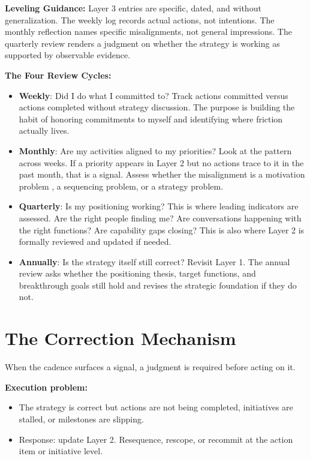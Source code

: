 \documentclass{article}
\begin{document}
\textbf{Leveling Guidance:} Layer 3 entries are specific, dated, and without generalization. The weekly log records actual actions,
not intentions. The monthly reflection names specific misalignments, not general impressions. The quarterly review renders a 
judgment on whether the strategy is working as supported by observable evidence.

\newpage

\textbf{The Four Review Cycles:}

\begin{itemize}
	\item \textbf{Weekly}: Did I do what I committed to? Track actions committed versus actions completed without strategy discussion. 
		The purpose is building the habit of honoring commitments to myself and identifying where friction actually lives.
  \item \textbf{Monthly}: Are my activities aligned to my priorities? Look at the pattern across weeks. If a priority appears in 
	  	Layer 2 but no actions trace to it in the past month, that is a signal. Assess whether the misalignment is a motivation problem
		, a sequencing problem, or a strategy problem.
  \item \textbf{Quarterly}: Is my positioning working? This is where leading indicators are assessed. Are the right people finding me?
	  	Are conversations happening with the right functions? Are capability gaps closing? This is also where Layer 2 is formally 
		reviewed and updated if needed.
  \item \textbf{Annually}: Is the strategy itself still correct? Revisit Layer 1. The annual review asks whether the positioning thesis,
	  	target functions, and breakthrough goals still hold and revises the strategic foundation if they do not.
\end{itemize}

\section{The Correction Mechanism}

When the cadence surfaces a signal, a judgment is required before acting on it.

\textbf{Execution problem:} 
\begin{itemize}
	\item The strategy is correct but actions are not being completed, initiatives are stalled, or milestones 
are slipping. 
	\item Response: update Layer 2. Resequence, rescope, or recommit at the action item or initiative level.
\end{itemize}
\end{document}
